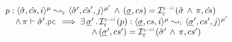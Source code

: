 \begin{lemma}\label{soundiness:control:flow:cmds}
$$
\begin{array}{l} 
\prog : \abssemrule{\sstate, \scs, i}{\sstate', \scs', j}{\mode}{\mode'}{\symbolic} 
     \, \wedge \, (\istate, \cs) = \interpret{\symbinst}{\senv}(\sstate \, \wedge \, \pc, \scs) \\ \quad
     \, \wedge \, {\pc \vdash \sstate'.\pcsel} 
     \implies 
        \exists \, \istate' \, . \, \interpret{\symbinst}{\senv}(\prog) : \abssemrule{\istate, \cs, i}{\istate', \cs', j}{\mode}{\mode'}{\instrumented} \\  \qquad \qquad \qquad \qquad \qquad
         \, \wedge \, 
            (\istate', \cs') = \interpret{\symbinst}{\senv}(\sstate' \, \wedge \, \pc, \cs')  
 \end{array}
$$
\end{lemma}

